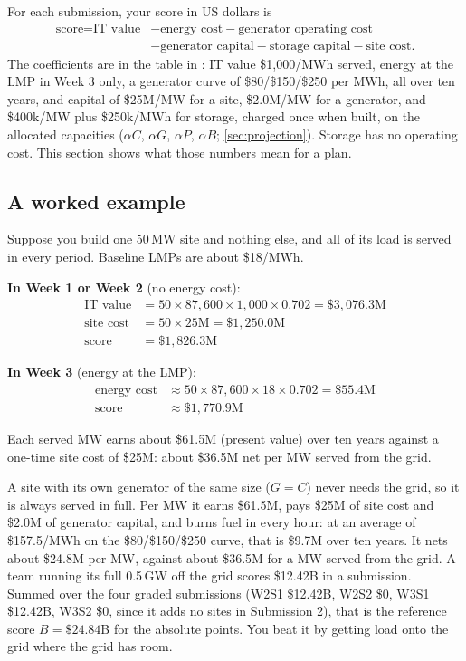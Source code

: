\documentclass[10pt]{article}
\newcommand{\MW}{\ensuremath{\,\mathrm{MW}}}
\begin{document}
For each submission, your score in US dollars is
\[
\begin{aligned}
  \text{score} = \text{IT value}
  &- \text{energy cost} - \text{generator operating cost}\\
  &- \text{generator capital} - \text{storage capital} - \text{site cost}.
\end{aligned}
\]
The coefficients are in the table in : IT value
\$1,000/MWh served, energy at the LMP in Week 3 only, a generator curve of
\$80/\$150/\$250 per MWh, all over ten years, and capital of \$25M/MW for a
site, \$2.0M/MW for a generator, and \$400k/MW plus \$250k/MWh for storage,
charged once when built, on the allocated capacities ($\alpha C$, $\alpha G$,
$\alpha P$, $\alpha B$; \cref{sec:projection}).
Storage has no operating cost. This section shows what those numbers mean for
a plan.

\subsection{A worked example}\label{subsec:worked_example}
Suppose you build one 50\MW{} site and nothing else, and all of its load is
served in every period. Baseline LMPs are about \$18/MWh.

\textbf{In Week 1 or Week 2} (no energy cost):
\begin{align*}
  \text{IT value}  &= 50 \times 87{,}600 \times 1{,}000 \times 0.702 = \$3{,}076.3\text{M}\\
  \text{site cost} &= 50 \times 25\text{M} = \$1{,}250.0\text{M}\\
  \text{score}     &= \$1{,}826.3\text{M}
\end{align*}

\textbf{In Week 3} (energy at the LMP):
\begin{align*}
  \text{energy cost} &\approx 50 \times 87{,}600 \times 18 \times 0.702 = \$55.4\text{M}\\
  \text{score}       &\approx \$1{,}770.9\text{M}
\end{align*}

Each served MW earns about \$61.5M (present value) over ten years against a
one-time site cost of \$25M: about \$36.5M net per MW served from the grid.

\begin{keybox}
A site with its own generator of the same size ($G = C$) never needs the grid,
so it is always served in full. Per MW it earns \$61.5M, pays \$25M of site
cost and \$2.0M of generator capital, and burns fuel in every hour: at an
average of \$157.5/MWh on the \$80/\$150/\$250 curve, that is \$9.7M over
ten years. It nets about \$24.8M per MW, against about \$36.5M for a MW
served from the grid. A team running its full 0.5\,GW off the grid scores
\$12.42B in a submission. Summed over the four graded submissions (W2S1
\$12.42B, W2S2 \$0, W3S1 \$12.42B, W3S2 \$0, since it adds no sites in
Submission 2), that is the reference score $B = \$24.84$B for the absolute
points. You beat it by
getting load onto the grid where the grid has room.
\end{keybox}
\end{document}
